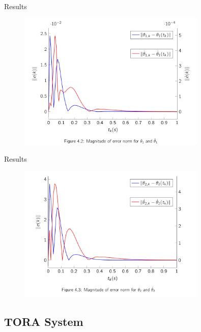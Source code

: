 \documentclass{beamer}
\begin{document}
\begin{frame}{Results}
  \begin{figure}[h]
    \centering
    \includegraphics[width=0.8\textwidth]{../Figures/ex1_err1.png}
  \end{figure}
\end{frame}

\begin{frame}{Results}
  \begin{figure}[h]
    \centering
    \includegraphics[width=0.8\textwidth]{../Figures/ex1_err2.png}
  \end{figure}
  
\end{frame}

\subsection{TORA System}
\end{document}
